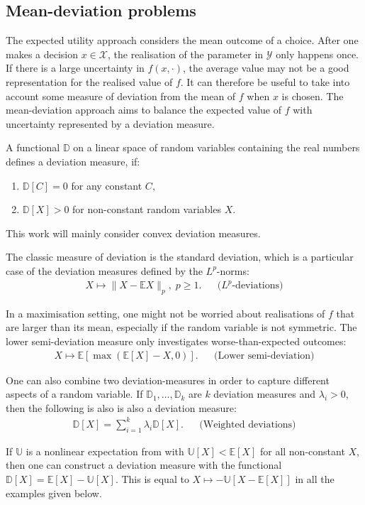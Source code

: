 \documentclass[main.tex]{subfiles}
\begin{document}
\subsection{Mean-deviation problems}
The expected utility approach considers the mean outcome of a choice.
After one makes a decision $x\in\mathcal{X}$, the realisation of the
parameter in $\mathcal{Y}$ only happens once. If there is a large
uncertainty in $f(x,\cdot)$, the average value may not be a good
representation for the realised value of $f$.
It can therefore be useful to take into account some measure of
deviation from the mean of $f$ when $x$ is chosen.
The mean-deviation approach aims to balance the expected value of $f$
with uncertainty represented by a deviation measure.
\begin{mydef}
  A functional $\mathbb{D}$ on a linear space of random
  variables containing the real numbers defines a deviation measure, if:
  \begin{enumerate}
  \item $\mathbb{D}[C] = 0$ for any constant $C$,
  \item $\mathbb{D}[X]>0$ for non-constant random variables $X$.
  \end{enumerate}
  This work will mainly consider convex deviation measures.
\end{mydef}

\begin{example}
  The classic measure of deviation is the standard deviation, which is
  a particular case of the deviation measures defined by
  the $L^p$-norms:
  \begin{align}
    X\mapsto \|X-\mathbb{E}X\|_p,\; p\geq 1.
    && \text{($L^p$-deviations)}
  \end{align}

  In a maximisation setting, one might not be worried about
  realisations of $f$ that are larger than its mean, especially if the
  random variable is not symmetric.
  The lower semi-deviation measure only investigates
  worse-than-expected outcomes:
  \begin{align}
    X\mapsto \mathbb{E}[\max(\mathbb{E}[X]-X,0)].
    &&\text{(Lower semi-deviation)}
  \end{align}

  One can also combine two deviation-measures in order to capture
  different aspects of a random variable.
  If $\mathbb{D}_1,\dots,\mathbb{D}_k$ are $k$ deviation measures and
  $\lambda_i>0$, then the following is also
  is also a deviation measure:
  \begin{align}
    \mathbb{D}[X]=\sum_{i=1}^k\lambda_i\mathbb{D}[X].
    &&\text{(Weighted deviations)}
  \end{align}

  If $\mathbb{U}$ is a nonlinear expectation from
   with $\mathbb{U}[X]< \mathbb
  E[X]$ for all non-constant $X$,
  then one can
  construct a deviation measure with the functional
  $\mathbb{D}[X]=\mathbb{E}[X]-\mathbb{U}[X]$.
  This is equal to $X\mapsto -\mathbb{U}[X-\mathbb{E}[X]]$ in all the
  examples given below.
\end{example}
\end{document}
